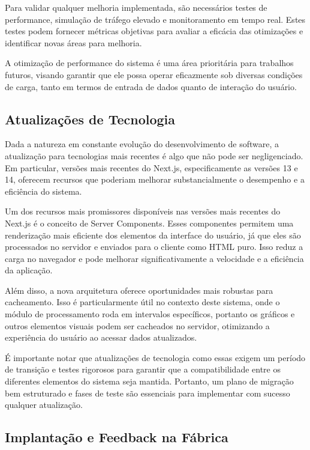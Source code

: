 Para validar qualquer melhoria implementada, são necessários testes de performance, simulação de tráfego elevado e monitoramento em tempo real. Estes testes podem fornecer métricas objetivas para avaliar a eficácia das otimizações e identificar novas áreas para melhoria.

A otimização de performance do sistema é uma área prioritária para trabalhos futuros, visando garantir que ele possa operar eficazmente sob diversas condições de carga, tanto em termos de entrada de dados quanto de interação do usuário.

\subsection{Atualizações de Tecnologia}

Dada a natureza em constante evolução do desenvolvimento de software, a atualização para tecnologias mais recentes é algo que não pode ser negligenciado. Em particular, versões mais recentes do Next.js, especificamente as versões 13 e 14, oferecem recursos que poderiam melhorar substancialmente o desempenho e a eficiência do sistema.

Um dos recursos mais promissores disponíveis nas versões mais recentes do Next.js é o conceito de Server Components. Esses componentes permitem uma renderização mais eficiente dos elementos da interface do usuário, já que eles são processados no servidor e enviados para o cliente como HTML puro. Isso reduz a carga no navegador e pode melhorar significativamente a velocidade e a eficiência da aplicação.

Além disso, a nova arquitetura oferece oportunidades mais robustas para cacheamento. Isso é particularmente útil no contexto deste sistema, onde o módulo de processamento roda em intervalos específicos, portanto os gráficos e outros elementos visuais podem ser cacheados no servidor, otimizando a experiência do usuário ao acessar dados atualizados.

É importante notar que atualizações de tecnologia como essas exigem um período de transição e testes rigorosos para garantir que a compatibilidade entre os diferentes elementos do sistema seja mantida. Portanto, um plano de migração bem estruturado e fases de teste são essenciais para implementar com sucesso qualquer atualização.


\subsection{Implantação e Feedback na Fábrica}

